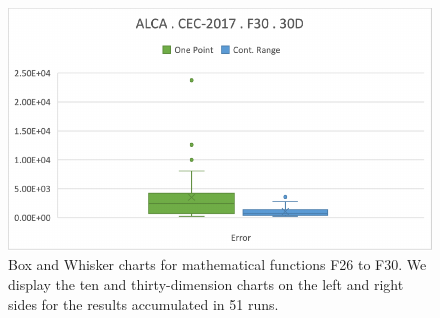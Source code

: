 \documentclass[graybox]{svmult}
\begin{document}
\begin{figure}[!ht]
\begin{minipage}[h]{0.49\linewidth}
        \end{minipage}
        \hfill
        \begin{minipage}[h]{0.49\linewidth}
            \includegraphics[width=1\linewidth]{img/fig_experiment_F30x30D.pdf} 
        \end{minipage}        

        \caption{Box and Whisker charts for mathematical functions F26 to F30. We display the ten and thirty-dimension charts on the left and right sides for the results accumulated in 51 runs.} \label{fig.experiment_F26-F30}
    \end{figure}

    \FloatBarrier


%


%

\end{document}
